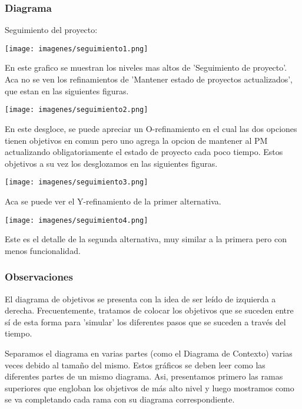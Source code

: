 \subsubsection{Diagrama}

Seguimiento del proyecto:

\texttt{[image: imagenes/seguimiento1.png]}

En este grafico se muestran los niveles mas altos de 'Seguimiento de proyecto'. Aca no se ven los refinamientos de 'Mantener estado de proyectos actualizados', que estan en las siguientes figuras.

\texttt{[image: imagenes/seguimiento2.png]}

En este desgloce, se puede apreciar un O-refinamiento en el cual las dos opciones tienen objetivos en comun pero uno agrega la opcion de mantener al PM actualizando obligatoriamente el estado de proyecto cada poco tiempo. Estos objetivos a su vez los desglozamos en las siguientes figuras.

\texttt{[image: imagenes/seguimiento3.png]}

Aca se puede ver el Y-refinamiento de la primer alternativa.

\texttt{[image: imagenes/seguimiento4.png]}

Este es el detalle de la segunda alternativa, muy similar a la primera pero con menos funcionalidad.

\newpage

\subsubsection{Observaciones}

El diagrama de objetivos se presenta con la idea de ser leído de izquierda a derecha. Frecuentemente, tratamos de colocar los objetivos que se suceden entre sí de esta forma para 'simular' los diferentes pasos que se suceden a través del tiempo.

Separamos el diagrama en varias partes (como el Diagrama de Contexto) varias veces debido al tamaño del mismo. Estos gráficos se deben leer como las diferentes partes de un mismo diagrama. Asi, presentamos primero las ramas superiores que engloban los objetivos de más alto nivel y luego mostramos como se va completando cada rama con su diagrama correspondiente.
